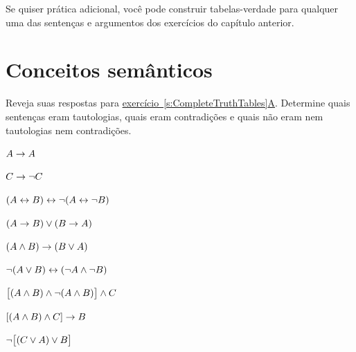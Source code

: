 Se quiser prática adicional, você pode construir tabelas-verdade para qualquer uma das sentenças e argumentos dos exercícios do capítulo anterior.



\chapter{Conceitos semânticos}\setcounter{ProbPart}{0}
\problempart
Reveja suas respostas para \hyperref[pr.TT.TTorC]{exercício~\ref*{s:CompleteTruthTables}A}. Determine quais sentenças eram tautologias, quais eram contradições e quais não eram nem tautologias nem contradições.
\begin{compactlist}
\item $A \rightarrow A$ \hfill {}
\item $C \rightarrow\neg C$ \hfill {}
\item $(A \leftrightarrow B) \leftrightarrow \neg(A\leftrightarrow \neg B)$  \hfill {}
\item $(A \rightarrow B) \vee (B \rightarrow A)$  \hfill {}
\item $(A \wedge B) \rightarrow (B \vee A)$  \hfill {}
\item $\neg(A \vee B) \leftrightarrow (\neg A \wedge \neg B)$ \hfill {}
\item $\bigl[(A\wedge B) \wedge\neg(A\wedge B)\bigr] \wedge C$  \hfill {}
\item $[(A \wedge B) \wedge C] \rightarrow B$  \hfill {}
\item $\neg\bigl[(C\vee A) \vee B\bigr]$  \hfill {}
\end{compactlist}

\

